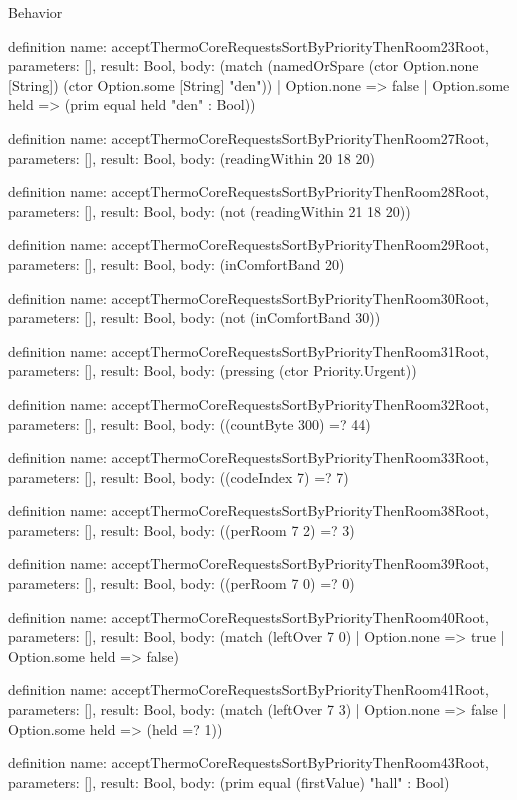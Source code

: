 \begin{lexlean}{Behavior}
\begin{semanticmodule}
definition{
  name: acceptThermoCoreRequestsSortByPriorityThenRoom23Root,
  parameters: [],
  result: Bool,
  body: (match (namedOrSpare (ctor Option.none [String]) (ctor Option.some [String] "den"))
    | Option.none => false
    | Option.some held => (prim equal held "den" : Bool))
}

definition{
  name: acceptThermoCoreRequestsSortByPriorityThenRoom27Root,
  parameters: [],
  result: Bool,
  body: (readingWithin 20 18 20)
}

definition{
  name: acceptThermoCoreRequestsSortByPriorityThenRoom28Root,
  parameters: [],
  result: Bool,
  body: (not (readingWithin 21 18 20))
}

definition{
  name: acceptThermoCoreRequestsSortByPriorityThenRoom29Root,
  parameters: [],
  result: Bool,
  body: (inComfortBand 20)
}

definition{
  name: acceptThermoCoreRequestsSortByPriorityThenRoom30Root,
  parameters: [],
  result: Bool,
  body: (not (inComfortBand 30))
}

definition{
  name: acceptThermoCoreRequestsSortByPriorityThenRoom31Root,
  parameters: [],
  result: Bool,
  body: (pressing (ctor Priority.Urgent))
}

definition{
  name: acceptThermoCoreRequestsSortByPriorityThenRoom32Root,
  parameters: [],
  result: Bool,
  body: ((countByte 300) =? 44)
}

definition{
  name: acceptThermoCoreRequestsSortByPriorityThenRoom33Root,
  parameters: [],
  result: Bool,
  body: ((codeIndex 7) =? 7)
}

definition{
  name: acceptThermoCoreRequestsSortByPriorityThenRoom38Root,
  parameters: [],
  result: Bool,
  body: ((perRoom 7 2) =? 3)
}

definition{
  name: acceptThermoCoreRequestsSortByPriorityThenRoom39Root,
  parameters: [],
  result: Bool,
  body: ((perRoom 7 0) =? 0)
}

definition{
  name: acceptThermoCoreRequestsSortByPriorityThenRoom40Root,
  parameters: [],
  result: Bool,
  body: (match (leftOver 7 0) | Option.none => true | Option.some held => false)
}

definition{
  name: acceptThermoCoreRequestsSortByPriorityThenRoom41Root,
  parameters: [],
  result: Bool,
  body: (match (leftOver 7 3) | Option.none => false | Option.some held => (held =? 1))
}

definition{
  name: acceptThermoCoreRequestsSortByPriorityThenRoom43Root,
  parameters: [],
  result: Bool,
  body: (prim equal (firstValue) "hall" : Bool)
}


\end{semanticmodule}
\end{lexlean}
